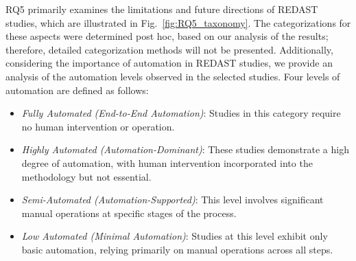 RQ5 primarily examines the limitations and future directions of REDAST studies, which are illustrated in Fig.~\ref{fig:RQ5_taxonomy}. The categorizations for these aspects were determined post hoc, based on our analysis of the results; therefore, detailed categorization methods will not be presented. Additionally, considering the importance of automation in REDAST studies, we provide an analysis of the automation levels observed in the selected studies. Four levels of automation are defined as follows:
\begin{itemize}
    \item \textit{Fully Automated (End-to-End Automation)}: Studies in this category require no human intervention or operation.
    \item \textit{Highly Automated (Automation-Dominant)}: These studies demonstrate a high degree of automation, with human intervention incorporated into the methodology but not essential.
    \item \textit{Semi-Automated (Automation-Supported)}: This level involves significant manual operations at specific stages of the process.
    \item \textit{Low Automated (Minimal Automation)}: Studies at this level exhibit only basic automation, relying primarily on manual operations across all steps.
\end{itemize}